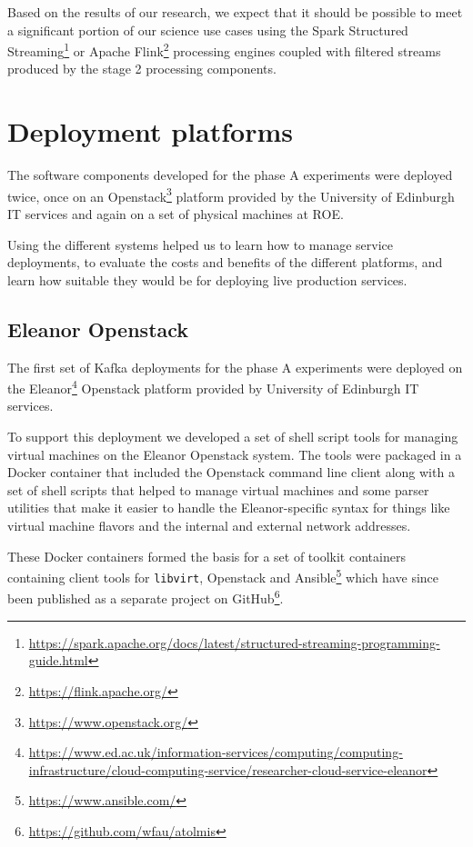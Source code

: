 \documentclass{article}
\newcommand{\ansible} {Ansible\xspace}
\newcommand{\docker} {Docker\xspace}
\newcommand{\openstack} {Openstack\xspace}
\newcommand{\libvirt} {\texttt{libvirt}\xspace}
\newcommand{\github} {GitHub\xspace}
\newcommand{\kafka} {Kafka\xspace}
\newcommand{\flink} {Flink\xspace}
\newcommand{\apache} {Apache\xspace}
\newcommand{\phasea} {phase A\xspace}
\newcommand{\stagetwo} {stage 2\xspace}
\newcommand{\uedin} {University of Edinburgh\xspace}
\newcommand{\eleanor} {Eleanor\xspace}
\newcommand{\footurl}[1] {\footnote{\url{#1}}}
\begin{document}
Based on the results of our research, we expect that it should be possible to meet a significant portion of our science use cases using the Spark Structured Streaming\footurl{https://spark.apache.org/docs/latest/structured-streaming-programming-guide.html} or \apache\flink\footurl{https://flink.apache.org/}  processing engines coupled with filtered streams produced by the \stagetwo processing components.

\section{Deployment platforms}
\label{deployment-platforms}

The software components developed for the \phasea experiments were deployed twice, once on an \openstack\footurl{https://www.openstack.org/} platform provided by the \uedin IT services and again on a set of physical machines at ROE. 

Using the different systems helped us to learn how to manage service deployments, to evaluate the costs and benefits of the different platforms, and learn how suitable they would be for deploying live production services.

\subsection{\eleanor \openstack}
\label{deployment-eleanor.openstack}

The first set of \kafka deployments for the \phasea  experiments were deployed on the \eleanor\footurl{https://www.ed.ac.uk/information-services/computing/computing-infrastructure/cloud-computing-service/researcher-cloud-service-eleanor} \openstack platform provided by \uedin IT services.

To support this deployment we developed a set of shell script tools for managing virtual machines on the \eleanor \openstack system. 
The tools were packaged in a \docker container that included the \openstack command line client along with a set of shell scripts that helped to manage virtual machines and some parser utilities that make it easier to handle the \eleanor-specific syntax for things like virtual machine flavors and the internal and external network addresses.

These \docker containers formed the basis for a set of toolkit containers containing client tools for \libvirt, \openstack and \ansible\footurl{https://www.ansible.com/} which have since been published as a separate project on \github\footurl{https://github.com/wfau/atolmis}.
\end{document}
